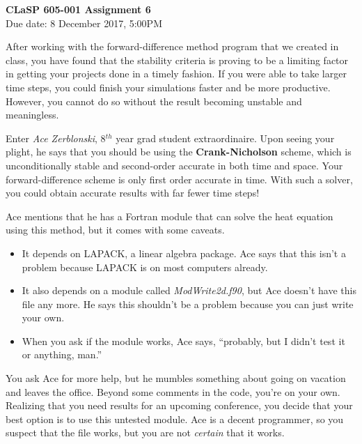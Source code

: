 \documentclass[12pt, letterpaper]{article}
\begin{document}
\begin{center}
  {\LARGE \textbf{CLaSP 605-001 Assignment 6}}\\
  {\large Due date: 8 December 2017, 5:00PM}\\
\end{center}

After working with the forward-difference method program that we created
in class, you have found that the stability criteria is proving to be a
limiting factor in getting your projects done in a timely fashion.  If you
were able to take larger time steps, you could finish your simulations faster
and be more productive.  However, you cannot do so without the result
becoming unstable and meaningless.

Enter \emph{Ace Zerblonski}, 8$^{th}$ year grad student extraordinaire.  Upon
seeing your plight, he says that you should be using the 
\textbf{Crank-Nicholson} scheme, which is unconditionally stable and 
second-order accurate in both time and space.  Your forward-difference scheme
is only first order accurate in time.  With such a solver, you could obtain
accurate results with far fewer time steps!

Ace mentions that he has a Fortran module that can solve the heat equation
using this method, but it comes with some caveats.
\begin{itemize}
  \item It depends on LAPACK, a linear algebra package.  Ace says that this
    isn't a problem because LAPACK is on most computers already.
  \item It also depends on a module called \textit{ModWrite2d.f90}, but
    Ace doesn't have this file any more.  He says this shouldn't be a problem
    because you can just write your own.
  \item When you ask if the module works, Ace says, ``probably, but I didn't
    test it or anything, man.''  
\end{itemize}

You ask Ace for more help, but he mumbles something about going on vacation
and leaves the office.  
Beyond some comments in the code, you're on your own.
Realizing that you need results for an upcoming
conference, you decide that your best option is to use this untested 
module.  Ace is a decent programmer, so you suspect that the file works, but
you are not \emph{certain} that it works.  
\end{document}
